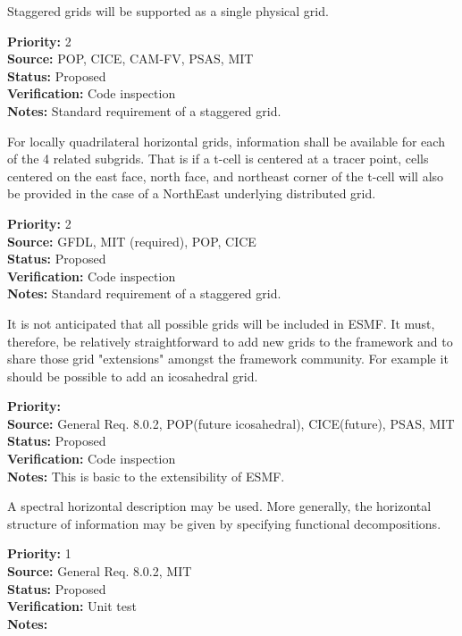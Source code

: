 Staggered grids will be supported as a single physical grid.
\begin{reqlist}
{\bf Priority:} 2 \\
{\bf Source:} POP, CICE, 
CAM-FV, PSAS, MIT  \\
{\bf Status:} Proposed \\
{\bf Verification:} Code inspection\\
{\bf Notes:} Standard requirement of a staggered grid.
\end{reqlist}

For locally quadrilateral horizontal grids, information shall be available for
each of the 4 related subgrids.  That is if a t-cell is centered at a tracer
point,  cells centered on the east face, north face, and northeast corner of
the t-cell will also be provided in the case of a NorthEast underlying
distributed grid.
\begin{reqlist}
{\bf Priority:} 2 \\
{\bf Source:} GFDL, MIT (required), POP, CICE \\
{\bf Status:} Proposed \\
{\bf Verification:} Code inspection\\
{\bf Notes:} Standard requirement of a staggered grid.
\end{reqlist}

It is not anticipated that all possible grids will be included in
ESMF. It must, therefore, be relatively straightforward to add
new grids to the framework and to share those grid "extensions"
amongst the framework community. For example it should be possible
to add an icosahedral grid.
\begin{reqlist}
{\bf Priority:} \\
{\bf Source:} General Req. 8.0.2, POP(future icosahedral), CICE(future), 
PSAS, MIT  \\
{\bf Status:} Proposed \\
{\bf Verification:} Code inspection \\
{\bf Notes:} This is basic to the extensibility of ESMF.
\end{reqlist}


A spectral horizontal description may be used.  More generally, the horizontal
structure of information may be given by specifying functional decompositions.
\begin{reqlist}
{\bf Priority:} 1 \\
{\bf Source:} General Req. 8.0.2, MIT  \\
{\bf Status:} Proposed \\
{\bf Verification:} Unit test\\
{\bf Notes:}
\end{reqlist}


